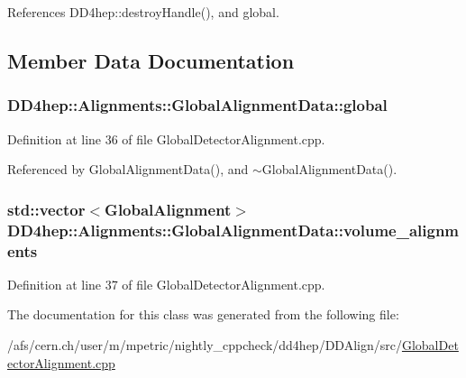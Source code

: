 References DD4hep::destroyHandle(), and global.

\subsection{Member Data Documentation}
\hypertarget{class_d_d4hep_1_1_alignments_1_1_global_alignment_data_a353b81eec4fa99a0ed451a513a2dcc54}{
\subsubsection[{global}]{ {\bf DD4hep::Alignments::GlobalAlignmentData::global}}}
\label{class_d_d4hep_1_1_alignments_1_1_global_alignment_data_a353b81eec4fa99a0ed451a513a2dcc54}


Definition at line 36 of file GlobalDetectorAlignment.cpp.

Referenced by GlobalAlignmentData(), and $\sim$GlobalAlignmentData().\hypertarget{class_d_d4hep_1_1_alignments_1_1_global_alignment_data_aaebd00327713124764b580f33523cdd5}{
\subsubsection[{volume\_\-alignments}]{\setlength{\rightskip}{0pt plus 5cm}std::vector$<${\bf GlobalAlignment}$>$ {\bf DD4hep::Alignments::GlobalAlignmentData::volume\_\-alignments}}}
\label{class_d_d4hep_1_1_alignments_1_1_global_alignment_data_aaebd00327713124764b580f33523cdd5}


Definition at line 37 of file GlobalDetectorAlignment.cpp.

The documentation for this class was generated from the following file:\begin{DoxyCompactItemize}
\item 
/afs/cern.ch/user/m/mpetric/nightly\_\-cppcheck/dd4hep/DDAlign/src/\hyperlink{_global_detector_alignment_8cpp}{GlobalDetectorAlignment.cpp}\end{DoxyCompactItemize}
